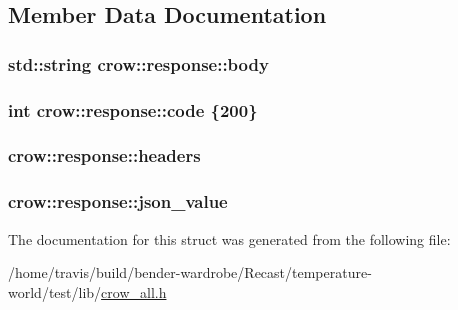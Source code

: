 \subsection{Member Data Documentation}
\hypertarget{structcrow_1_1response_ae9f3cc153eac05954f1f4e599527892d}{
\subsubsection[{body}]{\setlength{\rightskip}{0pt plus 5cm}std\-::string crow\-::response\-::body}}\label{structcrow_1_1response_ae9f3cc153eac05954f1f4e599527892d}
\hypertarget{structcrow_1_1response_aabc1f9b3264b8c5a2d05dcb409e8ff3f}{
\subsubsection[{code}]{\setlength{\rightskip}{0pt plus 5cm}int crow\-::response\-::code \{200\}}}\label{structcrow_1_1response_aabc1f9b3264b8c5a2d05dcb409e8ff3f}
\hypertarget{structcrow_1_1response_ae56cfc39f24a56748c11016842427fb3}{
\subsubsection[{headers}]{ crow\-::response\-::headers}}\label{structcrow_1_1response_ae56cfc39f24a56748c11016842427fb3}
\hypertarget{structcrow_1_1response_ad21c0b65173426d51eca46ef4d3f1106}{
\subsubsection[{json\-\_\-value}]{ crow\-::response\-::json\-\_\-value}}\label{structcrow_1_1response_ad21c0b65173426d51eca46ef4d3f1106}


The documentation for this struct was generated from the following file\-:\begin{DoxyCompactItemize}
\item 
/home/travis/build/bender-\/wardrobe/\-Recast/temperature-\/world/test/lib/\hyperlink{crow__all_8h}{crow\-\_\-all.\-h}\end{DoxyCompactItemize}
